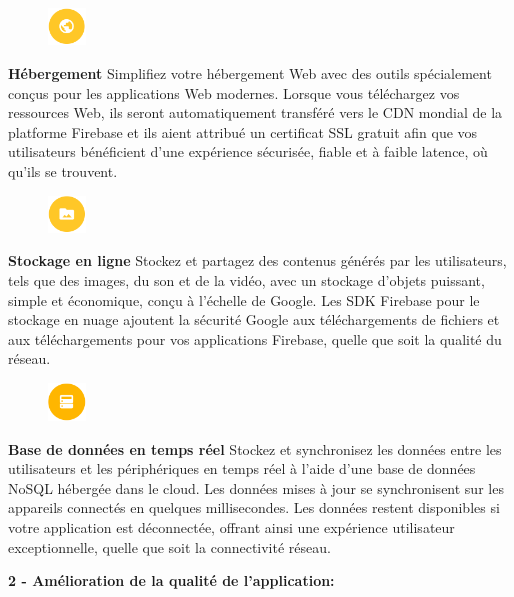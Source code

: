 \begin{figure}
	\includegraphics[width=1cm]{Images/chapter2/firebase_services/hosting.png}
\end{figure}
\textbf{Hébergement} Simplifiez votre hébergement Web avec des outils spécialement conçus pour les applications Web modernes. Lorsque vous téléchargez vos ressources Web, ils seront automatiquement transféré vers le CDN mondial de la platforme Firebase et ils aient attribué un certificat SSL gratuit afin que vos utilisateurs bénéficient d'une expérience sécurisée, fiable et à faible latence, où qu'ils se trouvent.\medskip

\begin{figure}
	\includegraphics[width=1cm]{Images/chapter2/firebase_services/cloud_storage.png}
\end{figure}
\textbf{Stockage en ligne} Stockez et partagez des contenus générés par les utilisateurs, tels que des images, du son et de la vidéo, avec un stockage d’objets puissant, simple et économique, conçu à l’échelle de Google. Les SDK Firebase pour le stockage en nuage ajoutent la sécurité Google aux téléchargements de fichiers et aux téléchargements pour vos applications Firebase, quelle que soit la qualité du réseau.\medskip

\begin{figure}
	\includegraphics[width=1cm]{Images/chapter2/firebase_services/realtime_database.png}
\end{figure}
\textbf{Base de données en temps réel} Stockez et synchronisez les données entre les utilisateurs et les périphériques en temps réel à l'aide d'une base de données NoSQL hébergée dans le cloud. Les données mises à jour se synchronisent sur les appareils connectés en quelques millisecondes. Les données restent disponibles si votre application est déconnectée, offrant ainsi une expérience utilisateur exceptionnelle, quelle que soit la connectivité réseau.\bigskip

\longtab \textbf{2 - Amélioration de la qualité de l'application:}\bigskip


